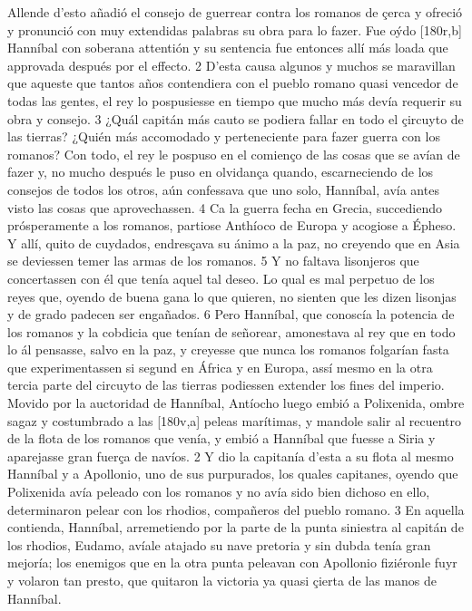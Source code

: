 \documentclass[11pt,twoside]{article}\makeatletter
\def\persName{}\def\name{}
\def\placeName{}
\begin{document}
\pend
{} Allende d’esto añadió el consejo de guerrear contra los romanos de çerca y ofreció y pronunció con muy extendidas palabras su obra para lo fazer. Fue oýdo %
[180r,b]  {\persName Hanníbal} con soberana attentión y su sentencia fue entonces allí más loada que approvada después por el effecto. 2 D’esta causa algunos y muchos se maravillan que aqueste  que tantos años contendiera con el pueblo romano quasi vencedor de todas las gentes, el rey lo pospusiesse en tiempo que mucho más devía requerir su obra y consejo. 3 ¿Quál capitán más cauto se podiera fallar en todo el çircuyto de las tierras? ¿Quién más accomodado y perteneciente para fazer guerra con los romanos? Con todo, el rey le pospuso en el comienço de las cosas que se avían de fazer y, no mucho después le puso en olvidança quando, escarneciendo de los consejos de todos los otros, aún confessava que uno solo,  {\persName Hanníbal}, avía antes visto las cosas que aprovechassen. 4 Ca la guerra fecha en Grecia, succediendo prósperamente a los romanos, partiose Anthíoco de Europa y acogiose a Épheso. Y allí, quito de cuydados, endresçava su ánimo a la paz, no creyendo que en Asia se deviessen temer las armas de los romanos. 5 Y no faltava lisonjeros que concertassen con él que tenía aquel tal deseo. Lo qual es mal perpetuo de los reyes que, oyendo de buena gana lo que quieren, no sienten que les dizen lisonjas y de grado padecen ser engañados. 6 Pero  {\persName Hanníbal}, que conoscía la potencia de los romanos y la cobdicia que tenían de señorear, amonestava al rey que en todo lo ál pensasse, salvo en la paz, y creyesse que nunca los romanos folgarían fasta que experimentassen si segund en  {\placeName África} y en Europa, assí mesmo en la otra tercia parte del circuyto de las tierras podiessen extender los fines del imperio.
\pend
{} Movido por la auctoridad de  {\persName Hanníbal}, Antíocho luego embió a Polixenida, ombre sagaz y costumbrado a las %
[180v,a] peleas marítimas, y mandole salir al recuentro de la flota de los romanos que venía, y embió a  {\persName Hanníbal} que fuesse a Siria y aparejasse gran fuerça de navíos. 2 Y dio la capitanía d’esta a su flota al mesmo  {\persName Hanníbal} y a Apollonio, uno de sus purpurados, los quales capitanes, oyendo que Polixenida avía peleado con los romanos y no avía sido bien dichoso en ello, determinaron pelear con los rhodios, compañeros del pueblo romano. 3 En aquella contienda,  {\persName Hanníbal}, arremetiendo por la parte de la punta siniestra al capitán de los rhodios, Eudamo, avíale atajado su nave pretoria y sin dubda tenía gran mejoría; los enemigos que en la otra punta peleavan con Apollonio fiziéronle fuyr y volaron tan presto, que quitaron la victoria ya quasi çierta de las manos de  {\persName Hanníbal}.
\end{document}
